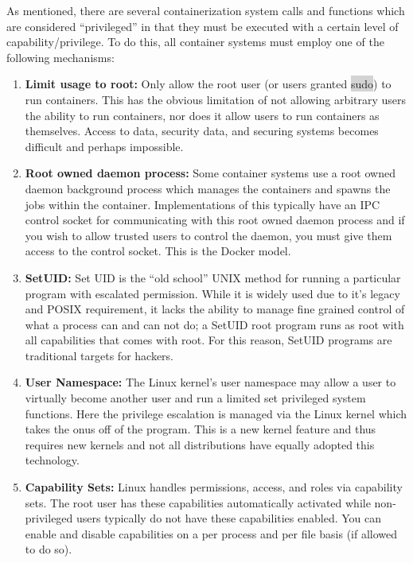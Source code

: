 \documentclass[a4paper]{article}
\newcounter{subsubsubsection}[subsubsection]
\begin{document}

As mentioned, there are several containerization system calls and functions which are considered “privileged” in that they must be executed with a certain level of capability/privilege. To do this, all container systems must employ one of the following mechanisms:

\begin{enumerate}
\item \textbf{Limit usage to root:} Only allow the root user (or users granted \colorbox{lightgray}{sudo}) to run containers. This has the obvious limitation of not allowing arbitrary users the ability to run containers, nor does it allow users to run containers as themselves. Access to data, security data, and securing systems becomes difficult and perhaps impossible.
\item \textbf{Root owned daemon process:} Some container systems use a root owned daemon background process which manages the containers and spawns the jobs within the container. Implementations of this typically have an IPC control socket for communicating with this root owned daemon process and if you wish to allow trusted users to control the daemon, you must give them access to the control socket. This is the Docker model.
\item \textbf{SetUID:} Set UID is the “old school” UNIX method for running a particular program with escalated permission. While it is widely used due to it’s legacy and POSIX requirement, it lacks the ability to manage fine grained control of what a process can and can not do; a SetUID root program runs as root with all capabilities that comes with root. For this reason, SetUID programs are traditional targets for hackers.
\item \textbf{User Namespace:} The Linux kernel’s user namespace may allow a user to virtually become another user and run a limited set privileged system functions. Here the privilege escalation is managed via the Linux kernel which takes the onus off of the program. This is a new kernel feature and thus requires new kernels and not all distributions have equally adopted this technology.
\item \textbf{Capability Sets:} Linux handles permissions, access, and roles via capability sets. The root user has these capabilities automatically activated while non-privileged users typically do not have these capabilities enabled. You can enable and disable capabilities on a per process and per file basis (if allowed to do so).

\end{enumerate}
\end{document}
